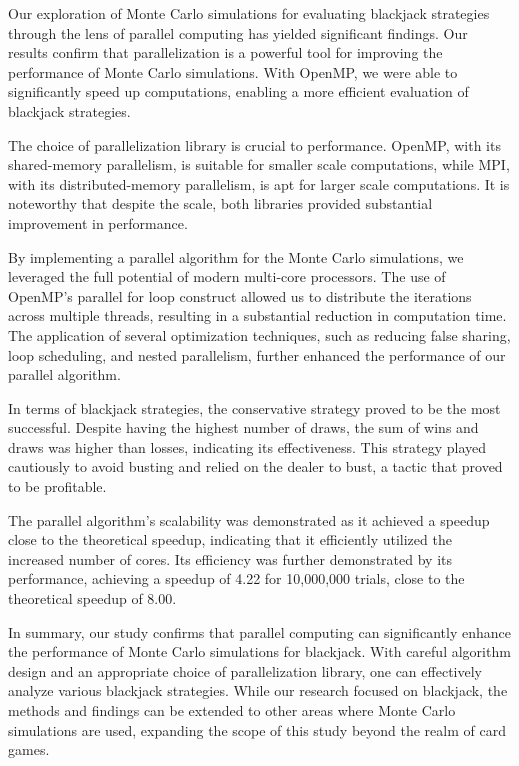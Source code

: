\documentclass[twocolumn]{report}
\begin{document}
Our exploration of Monte Carlo simulations for evaluating blackjack strategies through the lens of parallel computing has yielded significant findings. Our results confirm that parallelization is a powerful tool for improving the performance of Monte Carlo simulations. With OpenMP, we were able to significantly speed up computations, enabling a more efficient evaluation of blackjack strategies.

The choice of parallelization library is crucial to performance. OpenMP, with its shared-memory parallelism, is suitable for smaller scale computations, while MPI, with its distributed-memory parallelism, is apt for larger scale computations. It is noteworthy that despite the scale, both libraries provided substantial improvement in performance.

By implementing a parallel algorithm for the Monte Carlo simulations, we leveraged the full potential of modern multi-core processors. The use of OpenMP's parallel for loop construct allowed us to distribute the iterations across multiple threads, resulting in a substantial reduction in computation time. The application of several optimization techniques, such as reducing false sharing, loop scheduling, and nested parallelism, further enhanced the performance of our parallel algorithm.

In terms of blackjack strategies, the conservative strategy proved to be the most successful. Despite having the highest number of draws, the sum of wins and draws was higher than losses, indicating its effectiveness. This strategy played cautiously to avoid busting and relied on the dealer to bust, a tactic that proved to be profitable.

The parallel algorithm's scalability was demonstrated as it achieved a speedup close to the theoretical speedup, indicating that it efficiently utilized the increased number of cores. Its efficiency was further demonstrated by its performance, achieving a speedup of 4.22 for 10,000,000 trials, close to the theoretical speedup of 8.00.

In summary, our study confirms that parallel computing can significantly enhance the performance of Monte Carlo simulations for blackjack. With careful algorithm design and an appropriate choice of parallelization library, one can effectively analyze various blackjack strategies. While our research focused on blackjack, the methods and findings can be extended to other areas where Monte Carlo simulations are used, expanding the scope of this study beyond the realm of card games.
\end{document}
